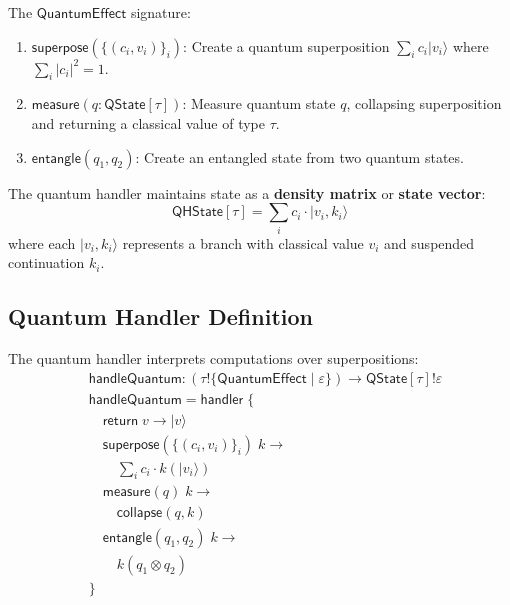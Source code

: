 \begin{definition}
\label{def:quantum-ops-detailed}
The $\mathsf{QuantumEffect}$ signature:
\begin{enumerate}
  \item $\mathsf{superpose}(\{(c_i, v_i)\}_i)$: Create a quantum superposition $\sum_i c_i |v_i\rangle$ where $\sum_i |c_i|^2 = 1$.

  \item $\mathsf{measure}(q : \mathsf{QState}[\tau])$: Measure quantum state $q$, collapsing superposition and returning a classical value of type $\tau$.

  \item $\mathsf{entangle}(q_1, q_2)$: Create an entangled state from two quantum states.
\end{enumerate}
\end{definition}

\begin{definition}
\label{def:quantum-state-rep}
The quantum handler maintains state as a \textbf{density matrix} or \textbf{state vector}:
\[
\mathsf{QHState}[\tau] = \sum_{i} c_i \cdot |v_i, k_i\rangle
\]
where each $|v_i, k_i\rangle$ represents a branch with classical value $v_i$ and suspended continuation $k_i$.
\end{definition}

\subsection{Quantum Handler Definition}
\label{subsec:quantum-handler-def}

\begin{definition}
\label{def:quantum-handler}
The quantum handler interprets computations over superpositions:
\begin{align}
&\mathsf{handleQuantum} : (\tau \mathbin{!} \{\mathsf{QuantumEffect} \mid \varepsilon\}) \to \mathsf{QState}[\tau] \mathbin{!} \varepsilon \\[2ex]
&\mathsf{handleQuantum} = \mathsf{handler}\; \{ \\
&\quad \mathsf{return}\; v \to |v\rangle \\[1ex]
&\quad \mathsf{superpose}(\{(c_i, v_i)\}_i)\; k \to \\
&\qquad \sum_{i} c_i \cdot k(|v_i\rangle) \\[1ex]
&\quad \mathsf{measure}(q)\; k \to \\
&\qquad \mathsf{collapse}(q, k) \\[1ex]
&\quad \mathsf{entangle}(q_1, q_2)\; k \to \\
&\qquad k(q_1 \otimes q_2) \\
&\}
\end{align}
\end{definition}

